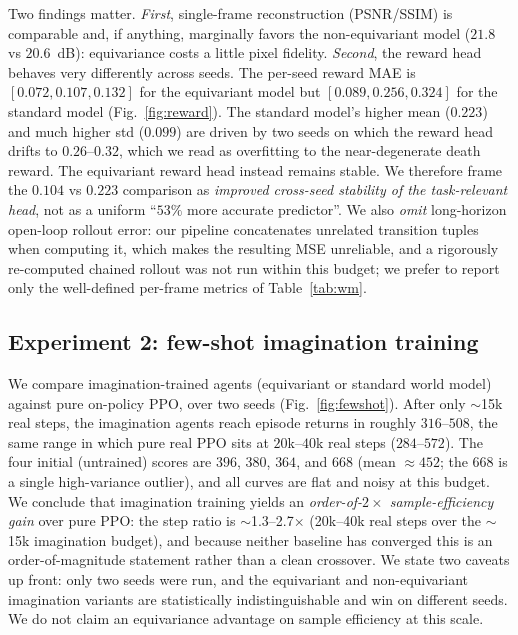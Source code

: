 \documentclass[preprint,12pt]{elsarticle}
\begin{document}
Two findings matter. \emph{First}, single-frame reconstruction (PSNR/SSIM)
is comparable and, if anything, marginally favors the non-equivariant model
($21.8$ vs $20.6$~dB): equivariance costs a little pixel fidelity.
\emph{Second}, the reward head behaves very differently across seeds. The
per-seed reward MAE is $[0.072,0.107,0.132]$ for the equivariant model but
$[0.089,0.256,0.324]$ for the standard model (Fig.~\ref{fig:reward}). The
standard model's higher mean ($0.223$) and much higher std ($0.099$) are
driven by two seeds on which the reward head drifts to $0.26$--$0.32$, which
we read as overfitting to the near-degenerate death reward. The equivariant
reward head instead remains stable. We therefore frame the $0.104$ vs
$0.223$ comparison as \emph{improved cross-seed stability of the task-relevant
head}, not as a uniform ``$53\%$ more accurate predictor''. We also
\emph{omit} long-horizon open-loop rollout error: our pipeline concatenates
unrelated transition tuples when computing it, which makes the resulting MSE
unreliable, and a rigorously re-computed chained rollout was not run within
this budget; we prefer to report only the well-defined per-frame metrics of
Table~\ref{tab:wm}.

\subsection{Experiment 2: few-shot imagination training}
We compare imagination-trained agents (equivariant or standard world model)
against pure on-policy PPO, over two seeds
(Fig.~\ref{fig:fewshot}). After only $\sim$15k real steps, the imagination
agents reach episode returns in roughly $316$--$508$, the same range in which
pure real PPO sits at $20$k--$40$k real steps ($284$--$572$). The four
initial (untrained) scores are $396$, $380$, $364$, and $668$ (mean $\approx452$;
the $668$ is a single high-variance outlier), and all curves are flat and
noisy at this budget. We conclude that imagination training yields an
\emph{order-of-$2\times$ sample-efficiency gain} over pure PPO: the step
ratio is $\sim$1.3--2.7$\times$ (20k--40k real steps over the $\sim$15k
imagination budget), and because neither baseline has converged this is an
order-of-magnitude statement rather than a clean crossover. We state two
caveats up front: only two seeds were run, and the equivariant and
non-equivariant imagination variants are statistically indistinguishable and
win on different seeds. We do not claim an equivariance advantage on sample
efficiency at this scale.
\end{document}
